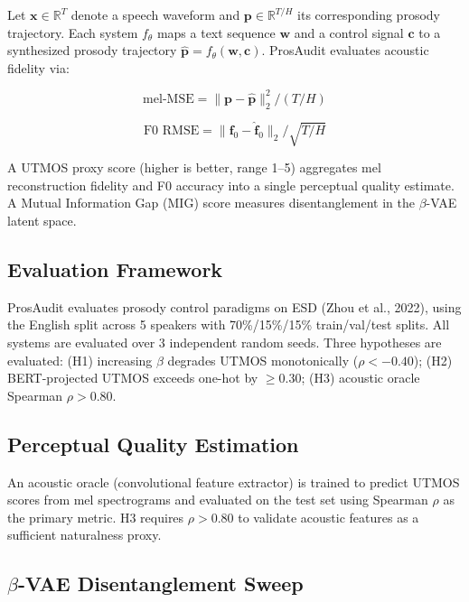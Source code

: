 \documentclass{article}
\begin{document}
Let $\mathbf{x} \in \mathbb{R}^T$ denote a speech waveform and $\mathbf{p} \in \mathbb{R}^{T/H}$ its corresponding prosody trajectory. Each system $f_\theta$ maps a text sequence $\mathbf{w}$ and a control signal $\mathbf{c}$ to a synthesized prosody trajectory $\hat{\mathbf{p}} = f_\theta(\mathbf{w}, \mathbf{c})$. ProsAudit evaluates acoustic fidelity via:

\begin{equation}
\text{mel-MSE} = \|\mathbf{p} - \hat{\mathbf{p}}\|_2^2 / (T/H)
\end{equation}

\begin{equation}
\text{F0 RMSE} = \|\mathbf{f}_0 - \hat{\mathbf{f}}_0\|_2 / \sqrt{T/H}
\end{equation}

A UTMOS proxy score (higher is better, range 1--5) aggregates mel reconstruction fidelity and F0 accuracy into a single perceptual quality estimate. A Mutual Information Gap (MIG) score measures disentanglement in the $\beta$-VAE latent space.

\subsection{Evaluation Framework}

\label{sec:evaluation_framework}

ProsAudit evaluates prosody control paradigms on ESD (Zhou et al., 2022), using the English split across 5 speakers with 70\%/15\%/15\% train/val/test splits. All systems are evaluated over 3 independent random seeds. Three hypotheses are evaluated: (H1) increasing $\beta$ degrades UTMOS monotonically ($\rho < -0.40$); (H2) BERT-projected UTMOS exceeds one-hot by $\geq$0.30; (H3) acoustic oracle Spearman $\rho > 0.80$.

\subsection{Perceptual Quality Estimation}

\label{sec:perceptual_quality_estimation}

An acoustic oracle (convolutional feature extractor) is trained to predict UTMOS scores from mel spectrograms and evaluated on the test set using Spearman $\rho$ as the primary metric. H3 requires $\rho > 0.80$ to validate acoustic features as a sufficient naturalness proxy.

\subsection{$\beta$-VAE Disentanglement Sweep}
\end{document}
